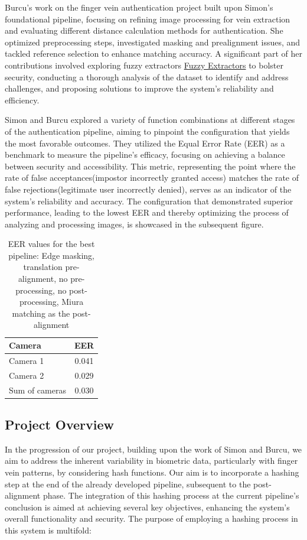 Burcu's work on the finger vein authentication project built upon Simon's foundational pipeline, focusing on refining image processing for vein extraction and evaluating different distance calculation methods for authentication. She optimized preprocessing steps, investigated masking and prealignment issues, and tackled reference selection to enhance matching accuracy. A significant part of her contributions involved exploring fuzzy extractors \hyperref[def:Fuzzy_Extractors]{Fuzzy Extractors} to bolster security, conducting a thorough analysis of the dataset to identify and address challenges, and proposing solutions to improve the system's reliability and efficiency.

Simon and Burcu explored a variety of function combinations at different stages of the authentication pipeline, aiming to pinpoint the configuration that yields the most favorable outcomes. They utilized the Equal Error Rate (EER) as a benchmark to measure the pipeline's efficacy, focusing on achieving a balance between security and accessibility. This metric, representing the point where the rate of false acceptances(impostor incorrectly granted access) matches the rate of false rejections(legitimate user incorrectly denied), serves as an indicator of the system's reliability and accuracy. The configuration that demonstrated superior performance, leading to the lowest EER and thereby optimizing the process of analyzing and processing images, is showcased in the subsequent figure.

\begin{table}[H]
    \centering
    \caption{EER values for the best pipeline: Edge masking, translation pre-alignment, no pre-processing, no post-
    processing, Miura matching as the post-alignment}
    \begin{tabular}{lc}
    \toprule
    Camera & EER \\
    \midrule
    Camera 1 & 0.041 \\
    Camera 2 & 0.029 \\
    Sum of cameras & 0.030 \\
    \bottomrule
    \end{tabular}
    \label{tab:eervalues_best}
\end{table}

\subsection{Project Overview}

In the progression of our project, building upon the work of Simon and Burcu, we aim to address the inherent variability in biometric data, particularly with finger vein patterns, by considering hash functions. Our aim is to incorporate a hashing step at the end of the already developed pipeline, subsequent to the post-alignment phase. The integration of this hashing process at the current pipeline's conclusion is aimed at achieving several key objectives, enhancing the system's overall functionality and security. The purpose of employing a hashing process in this system is multifold:

